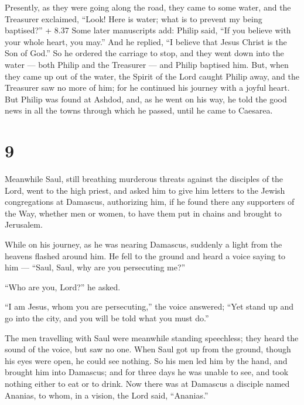  Presently, as they were going along the road, they came to
some water, and the Treasurer exclaimed, ``Look! Here is water; what is
to prevent my being baptised?''  + 8.37 Some later
manuscripts add: Philip said, ``If you believe with your whole heart,
you may.'' And he replied, ``I believe that Jesus Christ is the Son of
God.''  So he ordered the carriage to stop, and they went
down into the water --- both Philip and the Treasurer --- and Philip
baptised him.  But, when they came up out of the water, the
Spirit of the Lord caught Philip away, and the Treasurer saw no more of
him; for he continued his journey with a joyful heart.  But
Philip was found at Ashdod, and, as he went on his way, he told the good
news in all the towns through which he passed, until he came to
Caesarea.

\hypertarget{section-8}{%
\section{9}\label{section-8}}

 Meanwhile Saul, still breathing murderous threats against
the disciples of the Lord, went to the high priest,  and
asked him to give him letters to the Jewish congregations at Damascus,
authorizing him, if he found there any supporters of the Way, whether
men or women, to have them put in chains and brought to Jerusalem.

 While on his journey, as he was nearing Damascus, suddenly
a light from the heavens flashed around him.  He fell to the
ground and heard a voice saying to him --- ``Saul, Saul, why are you
persecuting me?''

 ``Who are you, Lord?'' he asked.

``I am Jesus, whom you are persecuting,'' the voice answered;
 ``Yet stand up and go into the city, and you will be told
what you must do.''

 The men travelling with Saul were meanwhile standing
speechless; they heard the sound of the voice, but saw no one.
 When Saul got up from the ground, though his eyes were
open, he could see nothing. So his men led him by the hand, and brought
him into Damascus;  and for three days he was unable to see,
and took nothing either to eat or to drink.  Now there was
at Damascus a disciple named Ananias, to whom, in a vision, the Lord
said, ``Ananias.''

